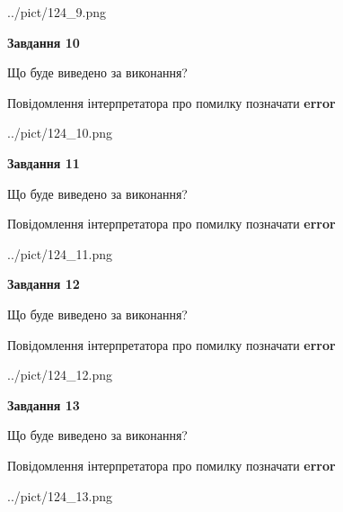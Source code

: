\documentclass[11pt, ukrainian]{article}
\begin{document}
{\begin {large}
\begin{center}
	{../pict/124_9.png}
\end{center}
\newpage

{\begin {center}\textbf{Завдання 10}\end {center}}\par
Що буде виведено за виконання? \par
Повідомлення інтерпретатора про помилку позначати \textbf{error}

\begin{center}
	{../pict/124_10.png}
\end{center}
\newpage

{\begin {center}\textbf{Завдання 11}\end {center}}\par
Що буде виведено за виконання? \par
Повідомлення інтерпретатора про помилку позначати \textbf{error}

\begin{center}
	{../pict/124_11.png}
\end{center}
\newpage

{\begin {center}\textbf{Завдання 12}\end {center}}\par
Що буде виведено за виконання? \par
Повідомлення інтерпретатора про помилку позначати \textbf{error}

\begin{center}
	{../pict/124_12.png}
\end{center}
\newpage

{\begin {center}\textbf{Завдання 13}\end {center}}\par
Що буде виведено за виконання? \par
Повідомлення інтерпретатора про помилку позначати \textbf{error}

\begin{center}
	{../pict/124_13.png}
\end{center}
\newpage


\end{large}}
\end{document}
